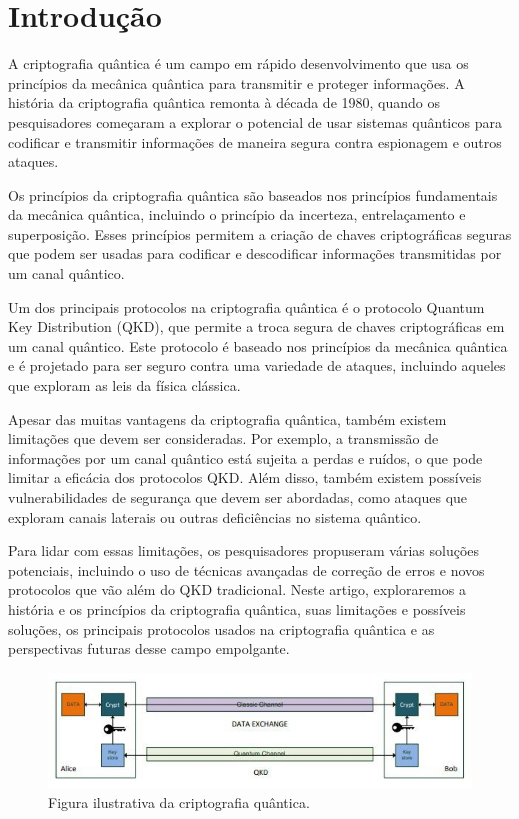 \chapter{Introdução}

A criptografia quântica é um campo em rápido desenvolvimento que usa os princípios da mecânica quântica para transmitir e proteger informações. A história da criptografia quântica remonta à década de 1980, quando os pesquisadores começaram a explorar o potencial de usar sistemas quânticos para codificar e transmitir informações de maneira segura contra espionagem e outros ataques.

Os princípios da criptografia quântica são baseados nos princípios fundamentais da mecânica quântica, incluindo o princípio da incerteza, entrelaçamento e superposição. Esses princípios permitem a criação de chaves criptográficas seguras que podem ser usadas para codificar e descodificar informações transmitidas por um canal quântico.

Um dos principais protocolos na criptografia quântica é o protocolo Quantum Key Distribution (QKD), que permite a troca segura de chaves criptográficas em um canal quântico. Este protocolo é baseado nos princípios da mecânica quântica e é projetado para ser seguro contra uma variedade de ataques, incluindo aqueles que exploram as leis da física clássica.

Apesar das muitas vantagens da criptografia quântica, também existem limitações que devem ser consideradas. Por exemplo, a transmissão de informações por um canal quântico está sujeita a perdas e ruídos, o que pode limitar a eficácia dos protocolos QKD. Além disso, também existem possíveis vulnerabilidades de segurança que devem ser abordadas, como ataques que exploram canais laterais ou outras deficiências no sistema quântico.

Para lidar com essas limitações, os pesquisadores propuseram várias soluções potenciais, incluindo o uso de técnicas avançadas de correção de erros e novos protocolos que vão além do QKD tradicional. Neste artigo, exploraremos a história e os princípios da criptografia quântica, suas limitações e possíveis soluções, os principais protocolos usados na criptografia quântica e as perspectivas futuras desse campo empolgante.

\begin{figure}[!hbt]
  \centering
  \includegraphics[width=\textwidth]{images/intro.jpg}
  \caption{Figura ilustrativa da criptografia quântica.}
  \label{fig:intro}
\end{figure}
\FloatBarrier

\newpage
